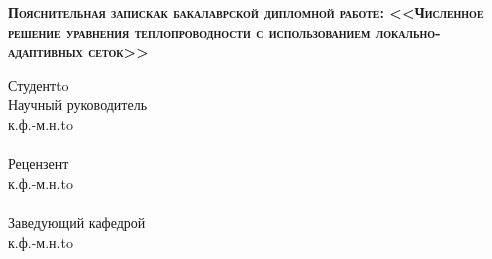 \begin{titlepage}
    \newpage
    
    \vspace{3em} %
    
   
    \begin{center}
        \textsc{ \textbf{Пояснительная записка\linebreak к бакалаврской дипломной работе: \linebreak  \Large <<Численное решение уравнения теплопроводности с использованием локально-адаптивных сеток>>}}
    \end{center} 

    
    \vspace{5em}
    
   
    \newbox{\lbox}
    
    \setlength{\maxl}{\wd\lbox}
    \hfill\parbox{12cm}{
    \hspace*{1cm}\hspace*{-1cm}Студент\hfill\hbox to\\
    
    \hspace*{1cm}\hspace*{-1cm}Научный руководитель\hfill\\
    \hspace*{1cm}\hspace*{-1cm}к.ф.-м.н.\hfill\hbox to\\ \\
    \hspace*{1cm}\hspace*{-1cm}Рецензент\hfill\\
    \hspace*{1cm}\hspace*{-1cm}к.ф.-м.н.\hfill\hbox to\\ \\ 
    \hspace*{1cm}\hspace*{-1cm}Заведующий кафедрой \hfill\\
    \hspace*{1cm}\hspace*{-1cm}к.ф.-м.н.\hfill\hbox to\\ \\ 
    
    }
    
   
    
    


\end{titlepage}
